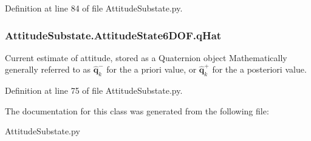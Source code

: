 Definition at line 84 of file Attitude\+Substate.\+py.

\subsubsection[{\texorpdfstring{q\+Hat}{qHat}}]{\setlength{\rightskip}{0pt plus 5cm}Attitude\+Substate.\+Attitude\+State6\+D\+O\+F.\+q\+Hat}\hypertarget{classAttitudeSubstate_1_1AttitudeState6DOF_a36a58a47280151dd544762d9a1d5c35d}{}\label{classAttitudeSubstate_1_1AttitudeState6DOF_a36a58a47280151dd544762d9a1d5c35d}


Current estimate of attitude, stored as a Quaternion object Mathematically generally referred to as $\mathbf{\hat{q}}^{-}_{k}$ for the a priori value, or $\mathbf{\hat{q}}^{+}_{k}$ for the a posteriori value. 



Definition at line 75 of file Attitude\+Substate.\+py.



The documentation for this class was generated from the following file\+:\begin{DoxyCompactItemize}
\item 
Attitude\+Substate.\+py\end{DoxyCompactItemize}
